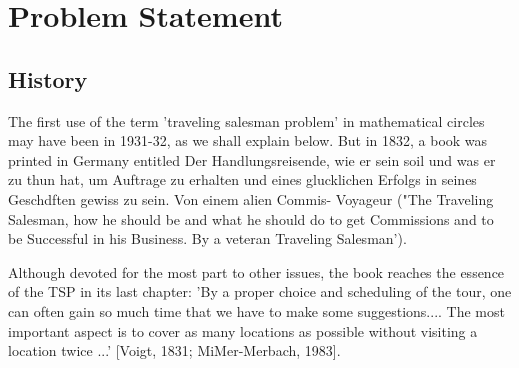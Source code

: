 \chapter{Problem Statement}

    \section{History}

    The first use of the term 'traveling salesman problem' in mathematical
    circles may have been in 1931-32, as we shall explain below. But in 1832, a
    book was printed in Germany entitled Der Handlungsreisende, wie er sein
    soil und was er zu thun hat, um Auftrage zu erhalten und eines glucklichen
    Erfolgs in seines Geschdften gewiss zu sein. Von einem alien Commis-
    Voyageur ("The Traveling Salesman, how he should be and what he should
    do to get Commissions and to be Successful in his Business. By a veteran
    Traveling Salesman'). 
    
    Although devoted for the most part to other issues,
    the book reaches the essence of the TSP in its last chapter: 'By a proper
    choice and scheduling of the tour, one can often gain so much time that we
    have to make some suggestions.... The most important aspect is to cover as
    many locations as possible without visiting a location twice ...' [Voigt, 1831;
    MiMer-Merbach, 1983].